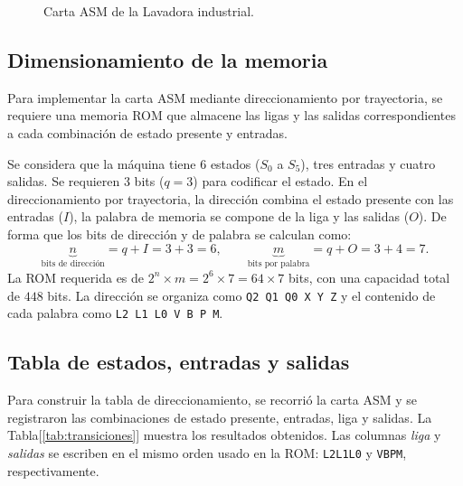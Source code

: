 \documentclass[letterpaper,12pt]{article}
\begin{document}
\begin{figure}[H]
{}
\caption{Carta ASM de la Lavadora industrial.}
\label{fig:carta-asm}
\end{figure}

\subsection{Dimensionamiento de la memoria}

Para implementar la carta ASM mediante direccionamiento por trayectoria, se requiere una memoria ROM que almacene las ligas y las salidas correspondientes a cada combinación de estado presente y entradas.

Se considera que la máquina tiene 6 estados ($S_0$ a $S_5$), tres entradas y cuatro salidas. Se requieren 3 bits ($q = 3$) para codificar el estado. En el direccionamiento por trayectoria, la dirección combina el estado presente con las entradas ($I$), la palabra de memoria se compone de la liga y las salidas ($O$). De forma que los bits de dirección y de palabra se calculan como:
\[
\underbrace{n}_{\text{bits de dirección}}=q+I=3+3=6,
\qquad
\underbrace{m}_{\text{bits por palabra}}=q+O=3+4=7.
\]
La ROM requerida es de $2^n\times m=2^6\times7=64\times7$ bits, con una capacidad total de $448$ bits. La dirección se organiza como \texttt{Q2 Q1 Q0 X Y Z} y el contenido de cada palabra como \texttt{L2 L1 L0 V B P M}.

\subsection{Tabla de estados, entradas y salidas}
Para construir la tabla de direccionamiento, se recorrió la carta ASM y se registraron las combinaciones de estado presente, entradas, liga y salidas. La Tabla[\ref{tab:transiciones}] muestra los resultados obtenidos. Las columnas \emph{liga} y \emph{salidas} se escriben en el mismo orden usado en la ROM: \texttt{L2L1L0} y \texttt{VBPM}, respectivamente.
\end{document}
